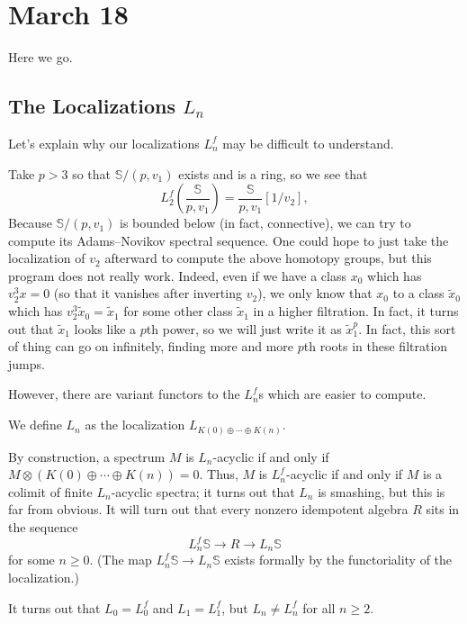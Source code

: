 \documentclass[../notes.tex]{subfiles}
\begin{document}
\section{March 18}
Here we go.

\subsection{The Localizations \texorpdfstring{$L_n$}{ Ln}}
Let's explain why our localizations $L_n^f$ may be difficult to understand.
\begin{example}
	Take $p>3$ so that $\mathbb S/(p,v_1)$ exists and is a ring, so we see that
	\[L_2^f\left(\frac{\mathbb S}{p,v_1}\right)=\frac{\mathbb S}{p,v_1}[1/v_2],\]
	Because $\mathbb S/(p,v_1)$ is bounded below (in fact, connective), we can try to compute its Adams--Novikov spectral sequence. One could hope to just take the localization of $v_2$ afterward to compute the above homotopy groups, but this program does not really work. Indeed, even if we have a class $x_0$ which has $v_2^3x=0$ (so that it vanishes after inverting $v_2$), we only know that $x_0$ to a class $\widetilde x_0$ which has $v_2^3\widetilde x_0=\widetilde x_1$ for some other class $\widetilde x_1$ in a higher filtration. In fact, it turns out that $\widetilde x_1$ looks like a $p$th power, so we will just write it as $\widetilde x_1^p$. In fact, this sort of thing can go on infinitely, finding more and more $p$th roots in these filtration jumps.
\end{example}
However, there are variant functors to the $L_n^f$s which are easier to compute.
\begin{definition}
	We define $L_n$ as the localization $L_{K(0)\oplus\cdots\oplus K(n)}$.
\end{definition}
\begin{remark}
	By construction, a spectrum $M$ is $L_n$-acyclic if and only if $M\otimes(K(0)\oplus\cdots\oplus K(n))=0$. Thus, $M$ is $L_n^f$-acyclic if and only if $M$ is a colimit of finite $L_n$-acyclic spectra; it turns out that $L_n$ is smashing, but this is far from obvious. It will turn out that every nonzero idempotent algebra $R$ sits in the sequence
	\[L_n^f\mathbb S\to R\to L_n\mathbb S\]
	for some $n\ge0$. (The map $L_n^f\mathbb S\to L_n\mathbb S$ exists formally by the functoriality of the localization.)
\end{remark}
\begin{remark}
	It turns out that $L_0=L_0^f$ and $L_1=L_1^f$, but $L_n\ne L_n^f$ for all $n\ge2$.
\end{remark}
\end{document}
